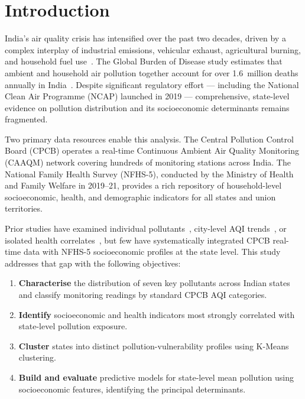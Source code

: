 \documentclass[10pt, conference]{IEEEtran}
\begin{document}
\section{Introduction}
\label{sec:intro}

India's air quality crisis has intensified over the past two
decades, driven by a complex interplay of industrial
emissions, vehicular exhaust, agricultural burning, and
household fuel use~\cite{balakrishnan2019}.
The Global Burden of Disease study estimates that ambient and
household air pollution together account for over 1.6~million
deaths annually in India~\cite{hei2020}.
Despite significant regulatory effort --- including the
National Clean Air Programme (NCAP) launched in 2019 ---
comprehensive, state-level evidence on pollution distribution
and its socioeconomic determinants remains fragmented.

Two primary data resources enable this analysis.
The Central Pollution Control Board (CPCB) operates a
real-time Continuous Ambient Air Quality Monitoring (CAAQM)
network covering hundreds of monitoring stations across India.
The National Family Health Survey (NFHS-5), conducted by the
Ministry of Health and Family Welfare in 2019--21, provides a
rich repository of household-level socioeconomic, health, and
demographic indicators for all states and union territories.

Prior studies have examined individual pollutants~\cite{kumar2015},
city-level AQI trends~\cite{garg2021}, or isolated health
correlates~\cite{landrigan2018}, but few have systematically
integrated CPCB real-time data with NFHS-5 socioeconomic
profiles at the state level.
This study addresses that gap with the following objectives:

\begin{enumerate}[leftmargin=*]
  \item \textbf{Characterise} the distribution of seven key
        pollutants across Indian states and classify
        monitoring readings by standard CPCB AQI categories.
  \item \textbf{Identify} socioeconomic and health indicators
        most strongly correlated with state-level pollution
        exposure.
  \item \textbf{Cluster} states into distinct
        pollution-vulnerability profiles using K-Means
        clustering.
  \item \textbf{Build and evaluate} predictive models for
        state-level mean pollution using socioeconomic
        features, identifying the principal determinants.
\end{enumerate}
\end{document}
